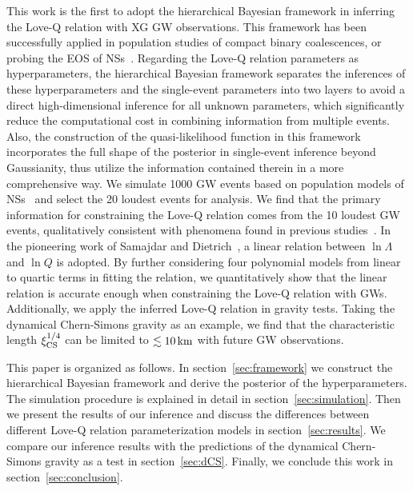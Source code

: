 \documentclass[a4paper,11pt]{article}
\begin{document}
This work is the first to adopt the hierarchical Bayesian framework in inferring the Love-Q relation with XG GW observations.
This framework has been successfully applied in 
population studies of compact binary coalescences, or probing the EOS of NSs~\cite{Mandel:2009nx,Mandel:2009pc,Adams:2012qw,Lackey:2014fwa,Mandel:2018mve,Golomb:2021tll,KAGRA:2021duu,Wang:2024xon}. 
Regarding the Love-Q relation parameters as hyperparameters, the hierarchical 
Bayesian framework separates the inferences of these hyperparameters and the 
single-event parameters into two layers to avoid a direct high-dimensional inference
for all unknown parameters, which significantly reduce the computational cost
in combining information from multiple events.
 Also, the construction of the quasi-likelihood
function in this framework incorporates the full shape of the
posterior in single-event inference beyond Gaussianity, thus
utilize the information contained therein in a more comprehensive way.
We simulate 1000 GW events based on population models of
NSs~\cite{Fishbach:2018edt,Farrow:2019xnc,Samajdar:2020xrd} and select the 20
loudest events for analysis. We find that the primary information for
constraining the Love-Q relation comes from the 10 loudest GW events,
qualitatively consistent
with phenomena found in
previous studies~\cite{Lackey:2014fwa}. In the pioneering work of Samajdar and
Dietrich~\cite{Samajdar:2020xrd}, a linear relation between $\ln\Lambda$ and $\ln Q$
is adopted. By further considering four polynomial models
from linear to quartic terms in fitting the relation, we quantitatively show
 that
the linear relation is accurate enough when constraining the Love-Q relation
with GWs. Additionally, we apply the inferred Love-Q relation in gravity tests.
Taking the dynamical Chern-Simons gravity as an example, we find that the
characteristic length $\xi_{\rm CS}^{1/4}$ can be limited to $\lesssim 10\,{\rm km}$
with future GW observations. 

This paper is organized as follows. In section~\ref{sec:framework} we construct 
the hierarchical Bayesian framework and derive the posterior of the hyperparameters. 
The simulation procedure is explained in detail in section~\ref{sec:simulation}. 
Then we present the results of our inference and discuss the differences between different 
Love-Q relation parameterization models in section~\ref{sec:results}. 
We compare our inference results with the predictions of the dynamical Chern-Simons 
gravity as a test in section~\ref{sec:dCS}. Finally, we conclude this work in section~\ref{sec:conclusion}.
\end{document}
